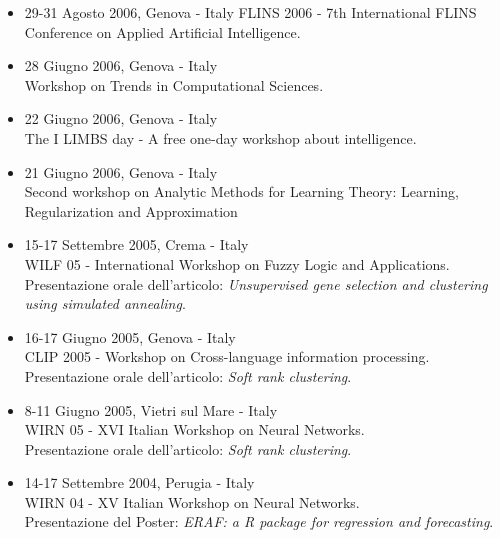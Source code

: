 \documentclass[a4paper,10pt]{article}
\begin{document}
\begin{itemize}
\item 29-31 Agosto 2006, Genova - Italy
  FLINS 2006 - 7th International FLINS Conference on Applied Artificial Intelligence.
\item 28 Giugno 2006, Genova - Italy \\
  Workshop on Trends in Computational Sciences.
\item 22 Giugno 2006, Genova - Italy \\
  The I LIMBS day - A free one-day workshop about intelligence.
\item 21 Giugno 2006, Genova - Italy \\
  Second workshop on Analytic Methods for Learning Theory: Learning, Regularization and Approximation
\item 15-17 Settembre 2005, Crema - Italy \\
  WILF 05 - International Workshop on Fuzzy Logic and Applications.
  \\Presentazione orale dell'articolo: \emph{Unsupervised gene selection and clustering using simulated annealing}.
\item 16-17 Giugno 2005, Genova - Italy \\
  CLIP 2005 - Workshop on Cross-language information processing.
  \\Presentazione orale dell'articolo: \emph{Soft rank clustering}.
\item 8-11 Giugno 2005, Vietri sul Mare - Italy \\
  WIRN 05 - XVI Italian Workshop on Neural Networks.
  \\Presentazione orale dell'articolo: \emph{Soft rank clustering}.
\item 14-17 Settembre 2004, Perugia - Italy \\
  WIRN 04 - XV Italian Workshop on Neural Networks.
  \\Presentazione del Poster: \emph{ERAF: a R package for regression and forecasting}.
\end{itemize}
\end{document}
